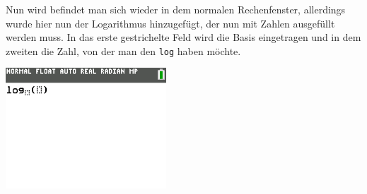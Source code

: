 \begin{paracol}{2}
	\begin{flushleft}
	Nun wird befindet man sich wieder in dem normalen Rechenfenster, allerdings wurde hier nun der Logarithmus hinzugefügt, der nun mit Zahlen ausgefüllt werden muss. In das erste gestrichelte Feld wird die Basis eingetragen und in dem zweiten die Zahl, von der man den \texttt{log} haben möchte.
	\end{flushleft}	
\switchcolumn
	\begin{flushright}
		\includegraphics[width=6cm]{Media/GRT/Visualisierung/logarithmus/log_3.png}
	\end{flushright}
\end{paracol}


\pagebreak












